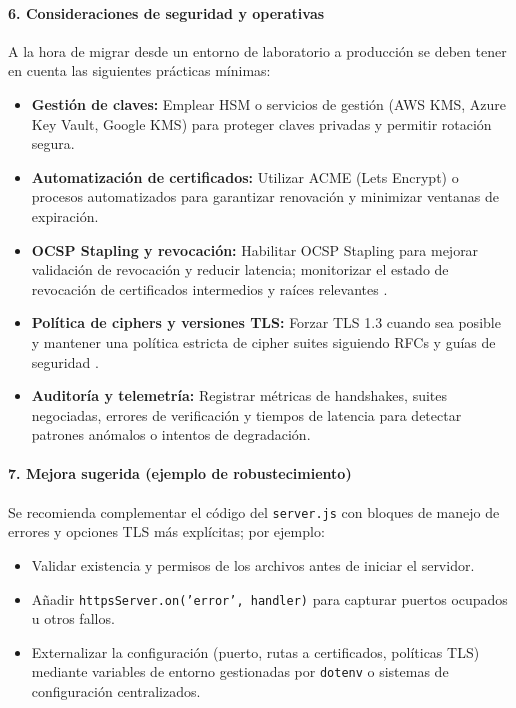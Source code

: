 \paragraph{6. Consideraciones de seguridad y operativas}
A la hora de migrar desde un entorno de laboratorio a producción se deben tener en cuenta las siguientes prácticas mínimas:
\begin{itemize}
  \item \textbf{Gestión de claves:} Emplear HSM o servicios de gestión (AWS KMS, Azure Key Vault, Google KMS) para proteger claves privadas y permitir rotación segura.
  \item \textbf{Automatización de certificados:} Utilizar ACME (Let\textquotesingle s Encrypt) o procesos automatizados para garantizar renovación y minimizar ventanas de expiración.
  \item \textbf{OCSP Stapling y revocación:} Habilitar OCSP Stapling para mejorar validación de revocación y reducir latencia; monitorizar el estado de revocación de certificados intermedios y raíces relevantes \cite{liu2015, helme2024}.
  \item \textbf{Política de ciphers y versiones TLS:} Forzar TLS 1.3 cuando sea posible y mantener una política estricta de cipher suites siguiendo RFCs y guías de seguridad \cite{rfc8446, rfc7525}.
  \item \textbf{Auditoría y telemetría:} Registrar métricas de handshakes, suites negociadas, errores de verificación y tiempos de latencia para detectar patrones anómalos o intentos de degradación.
\end{itemize}

\paragraph{7. Mejora sugerida (ejemplo de robustecimiento)}
Se recomienda complementar el código del \texttt{server.js} con bloques de manejo de errores y opciones TLS más explícitas; por ejemplo:
\begin{itemize}
  \item Validar existencia y permisos de los archivos antes de iniciar el servidor.
  \item Añadir \texttt{httpsServer.on('error', handler)} para capturar puertos ocupados u otros fallos.
  \item Externalizar la configuración (puerto, rutas a certificados, políticas TLS) mediante variables de entorno gestionadas por \texttt{dotenv} o sistemas de configuración centralizados.
\end{itemize}

